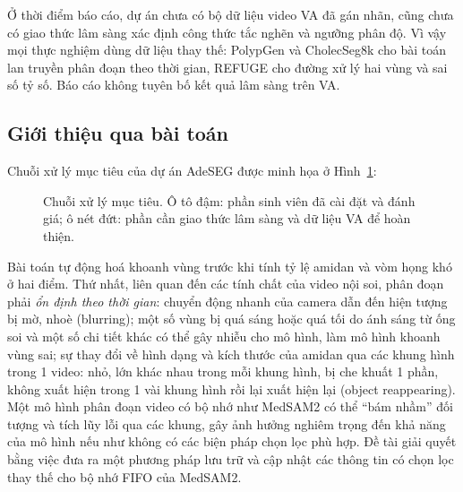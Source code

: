 \documentclass[a4paper,12pt]{report}
\begin{document}
Ở thời điểm báo cáo, dự án chưa có bộ dữ liệu video VA đã gán nhãn, cũng chưa có giao thức lâm sàng xác định công thức tắc nghẽn và ngưỡng phân độ. Vì vậy mọi thực nghiệm dùng dữ liệu thay thế: PolypGen \cite{polypgen} và CholecSeg8k \cite{cholecseg8k} cho bài toán lan truyền phân đoạn theo thời gian, REFUGE \cite{refuge} cho đường xử lý hai vùng và sai số tỷ số. Báo cáo không tuyên bố kết quả lâm sàng trên VA.

\subsection{Giới thiệu qua bài toán}

Chuỗi xử lý mục tiêu của dự án AdeSEG được minh họa ở Hình~\ref{fig:pipeline}:
\begin{figure}[htbp]
\centering
{}
\caption{Chuỗi xử lý mục tiêu. Ô tô đậm: phần sinh viên đã cài đặt và đánh giá; ô nét đứt: phần cần giao thức lâm sàng và dữ liệu VA để hoàn thiện.}
\label{fig:pipeline}
\end{figure}

Bài toán tự động hoá khoanh vùng trước khi tính tỷ lệ amidan và vòm họng khó ở hai điểm. Thứ nhất, liên quan đến các tính chất của video nội soi, phân đoạn phải \emph{ổn định theo thời gian}: chuyển động nhanh của camera dẫn đến hiện tượng bị mờ, nhoè (blurring); một số vùng bị quá sáng hoặc quá tối do ánh sáng từ ống soi và một số chi tiết khác có thể gây nhiễu cho mô hình, làm mô hình khoanh vùng sai; sự thay đổi về hình dạng và kích thước của amidan qua các khung hình trong 1 video: nhỏ, lớn khác nhau trong mỗi khung hình, bị che khuất 1 phần, không xuất hiện trong 1 vài khung hình rồi lại xuất hiện lại (object reappearing). Một mô hình phân đoạn video có bộ nhớ như MedSAM2 có thể ``bám nhầm'' đối tượng và tích lũy lỗi qua các khung, gây ảnh hưởng nghiêm trọng đến khả năng của mô hình nếu như không có các biện pháp chọn lọc phù hợp. Đề tài giải quyết bằng việc đưa ra một phương pháp lưu trữ và cập nhật các thông tin có chọn lọc thay thế cho bộ nhớ FIFO của MedSAM2.
\end{document}
